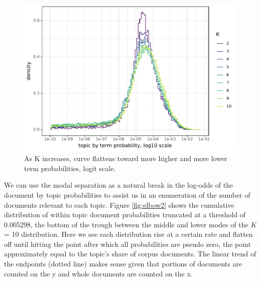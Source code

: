 \documentclass[]{book}
\theoremstyle{definition}
\theoremstyle{definition}
\theoremstyle{definition}
\theoremstyle{remark}
\begin{document}
\begin{figure}

{\centering \includegraphics[width=0.9\linewidth]{03_files/figure-latex/log10-betap-1} 

}

\caption{As K increases, curve flattens toward more higher and more lower term probabilities, logit scale.}\label{fig:log10-betap}
\end{figure}

We can use the modal separation as a natural break in the log-odds of
the document by topic probabilities to assist us in an enumeration of
the number of documents relevant to each topic. Figure \ref{fig:elbow2}
shows the cumulative distribution of within topic document probabilities
truncated at a threshold of 0.005298, the bottom of the trough between
the middle and lower modes of the \(K\) = 10 distribution. Here we see
each distribution rise at a certain rate and flatten off until hitting
the point after which all probabilities are pseudo zero, the point
approximately equal to the topic's share of corpus documents. The linear
trend of the endpoints (dotted line) makes sense given that portions of
documents are counted on the y and whole documents are counted on the x.
\end{document}
